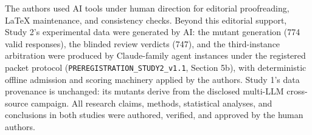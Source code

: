 \documentclass[manuscript,screen,review]{acmart}
\begin{document}
The authors used AI tools under human direction for editorial proofreading,
LaTeX maintenance, and consistency checks. Beyond this editorial support,
Study 2's experimental data were generated by AI: the mutant generation
(774 valid responses), the blinded review verdicts (747), and the
third-instance arbitration were produced by Claude-family agent instances
under the registered packet protocol (\texttt{PREREGISTRATION\_STUDY2\_v1.1},
Section 5b), with deterministic offline admission and scoring machinery
applied by the authors. Study 1's data provenance is unchanged: its mutants
derive from the disclosed multi-LLM cross-source campaign. All research
claims, methods, statistical analyses, and conclusions in both studies were
authored, verified, and approved by the human authors.



\end{document}

